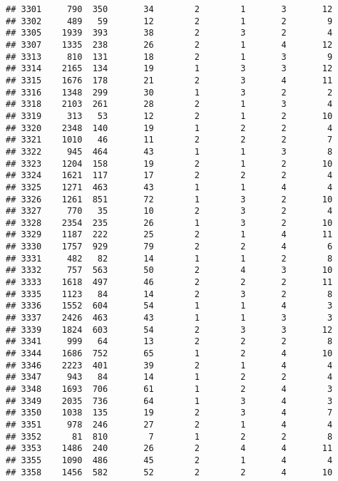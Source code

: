 \documentclass[]{article}
\begin{document}
\begin{verbatim}
## 3301     790  350       34        2        1       3       12
## 3302     489   59       12        2        1       2        9
## 3305    1939  393       38        2        3       2        4
## 3307    1335  238       26        2        1       4       12
## 3313     810  131       18        2        1       3        9
## 3314    2165  134       19        1        3       3       12
## 3315    1676  178       21        2        3       4       11
## 3316    1348  299       30        1        3       2        2
## 3318    2103  261       28        2        1       3        4
## 3319     313   53       12        2        1       2       10
## 3320    2348  140       19        1        2       2        4
## 3321    1010   46       11        2        2       2        7
## 3322     945  464       43        1        1       3        8
## 3323    1204  158       19        2        1       2       10
## 3324    1621  117       17        2        2       2        4
## 3325    1271  463       43        1        1       4        4
## 3326    1261  851       72        1        3       2       10
## 3327     770   35       10        2        3       2        4
## 3328    2354  235       26        1        3       2       10
## 3329    1187  222       25        2        1       4       11
## 3330    1757  929       79        2        2       4        6
## 3331     482   82       14        1        1       2        8
## 3332     757  563       50        2        4       3       10
## 3333    1618  497       46        2        2       2       11
## 3335    1123   84       14        2        3       2        8
## 3336    1552  604       54        1        1       4        3
## 3337    2426  463       43        1        1       3        3
## 3339    1824  603       54        2        3       3       12
## 3341     999   64       13        2        2       2        8
## 3344    1686  752       65        1        2       4       10
## 3346    2223  401       39        2        1       4        4
## 3347     943   84       14        1        2       2        4
## 3348    1693  706       61        1        2       4        3
## 3349    2035  736       64        1        3       4        3
## 3350    1038  135       19        2        3       4        7
## 3351     978  246       27        2        1       4        4
## 3352      81  810        7        1        2       2        8
## 3353    1486  240       26        2        4       4       11
## 3355    1090  486       45        2        1       4        4
## 3358    1456  582       52        2        2       4       10

\end{verbatim}
\end{document}
